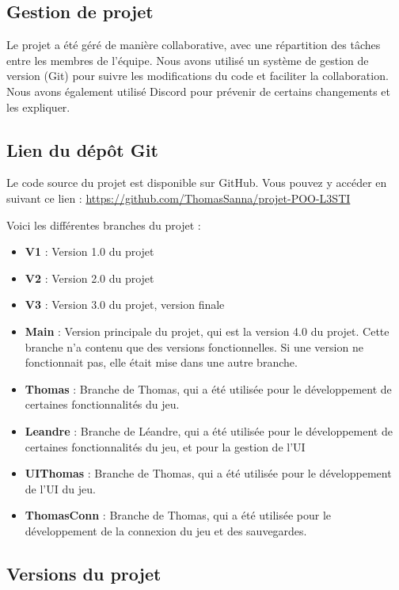 \documentclass{article}
\begin{document}
\subsection{Gestion de projet}
Le projet a été géré de manière collaborative, avec une répartition des tâches entre les membres de l'équipe. Nous avons utilisé un système de gestion de version (Git) pour suivre les modifications du code et faciliter la collaboration. Nous avons également utilisé Discord pour prévenir de certains changements et les expliquer.

\subsection{Lien du dépôt Git}

Le code source du projet est disponible sur GitHub. Vous pouvez y accéder en suivant ce lien : 
\href{https://github.com/ThomasSanna/projet-POO-L3STI}{https://github.com/ThomasSanna/projet-POO-L3STI}

Voici les différentes branches du projet :
\begin{itemize}
  \item \textbf{V1} : Version 1.0 du projet
  \item \textbf{V2} : Version 2.0 du projet
  \item \textbf{V3} : Version 3.0 du projet, version finale
  \item \textbf{Main} : Version principale du projet, qui est la version 4.0 du projet. Cette branche n'a contenu que des versions fonctionnelles. Si une version ne fonctionnait pas, elle était mise dans une autre branche.
  \item \textbf{Thomas} : Branche de Thomas, qui a été utilisée pour le développement de certaines fonctionnalités du jeu.
  \item \textbf{Leandre} : Branche de Léandre, qui a été utilisée pour le développement de certaines fonctionnalités du jeu, et pour la gestion de l'UI
  \item \textbf{UIThomas} : Branche de Thomas, qui a été utilisée pour le développement de l'UI du jeu.
  \item \textbf{ThomasConn} : Branche de Thomas, qui a été utilisée pour le développement de la connexion du jeu et des sauvegardes.
\end{itemize}



\subsection{Versions du projet}
\end{document}
